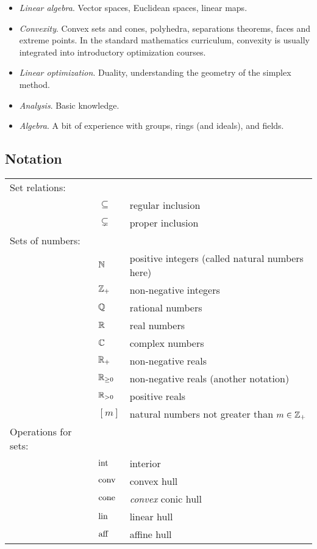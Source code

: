 \begin{itemize}
	\item[] \emph{Linear algebra}. Vector spaces, Euclidean spaces, linear maps. 
	\item[] \emph{Convexity}. Convex sets and cones, polyhedra, separations theorems, faces and extreme points. In the standard mathematics curriculum, convexity is usually integrated into introductory optimization courses.
	\item[] \emph{Linear optimization}. Duality, understanding the geometry of the simplex method. 
	\item[] \emph{Analysis}. Basic knowledge. 
	\item[] \emph{Algebra}. A bit of experience with groups, rings (and ideals), and fields. 
\end{itemize}

\subsection{Notation} 

\begin{tabular}{lll}
Set relations:	& & 
\\		& $\subseteq$ & regular inclusion 
\\ 		& $\varsubsetneq$ & proper inclusion
\\ Sets of numbers: & &
\\ & $\mathbb{N}$  & positive integers (called natural numbers here)
\\ & $\mathbb{Z}_+$ & non-negative integers
\\ & $\mathbb{Q}$ & rational numbers
\\ & $\mathbb{R}$ & real numbers
\\ & $\mathbb{C}$ & complex numbers
\\ & $\mathbb{R}_+$ & non-negative reals 
\\ & $\mathbb{R}_{\ge 0}$ & non-negative reals (another notation)
\\ & $\mathbb{R}_{>0}$ & positive reals
\\ & $[m]$ & natural numbers not greater than $m \in \mathbb{Z}_+$
\\ Operations for sets: & & 
\\ & $\operatorname{int}$ & interior
\\ &  $\operatorname{conv}$ & convex hull
\\ &  $\operatorname{cone}$ & \emph{convex} conic hull
\\ & $\operatorname{lin}$ & linear hull
\\ & $\operatorname{aff}$ & affine hull
\end{tabular} 

